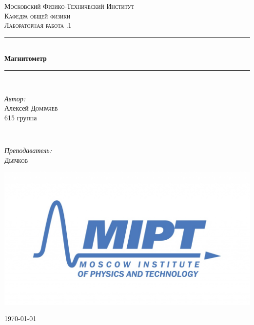 \documentclass[a4paper, 12pt]{article}
\newenvironment{bottompar}{\par\vspace*{\fill}}{\clearpage}
\begin{document}
\begin{titlepage}

\newcommand{\HRule}{\rule{\linewidth}{0.5mm}} %

\center %
 

\textsc{\LARGE Московский Физико-Технический Институт}\\[1,5cm] %
\textsc{\Large Кафедра общей физики}\\[0.5cm] %
\textsc{\large Лабораторная работа .1}\\[0.5cm] %


\HRule
\\[0.4cm]
{ \huge \bfseries Магнитометр}
\\[0.2cm] %
\HRule
\\[1.5cm]


 

\begin{minipage}{0.4\textwidth}
	\begin{flushleft} \large
		\emph{Автор:}\\
		Алексей \textsc{Домрачев} \\
		615 группа
	\end{flushleft}
\end{minipage}
~
\begin{minipage}{0.4\textwidth}
	\begin{flushright} \large
		\emph{Преподаватель:} \\
		 \textsc{Дьячков} %
	\end{flushright}
\end{minipage}

\begin{bottompar}
	\begin{center}
		\includegraphics[width = 80 mm]{logo.jpg}
	\end{center}
	{\large \today}


\end{bottompar}
\end{titlepage}
\end{document}
